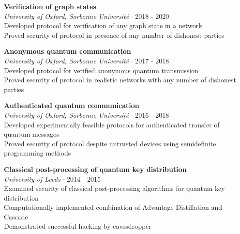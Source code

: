 \documentclass[12pt,a4paper]{article}
\newcommand{\middot}{\boldsymbol{\cdot}}
\begin{document}
\vspace{3mm}

\begin{flushleft}
\textbf{Verification of graph states} \\
\textit{University of Oxford, Sorbonne Universit\'e} $\middot$ 2018 - 2020 \\
Developed protocol for verification of any graph state in a network  \\
Proved security of protocol in presence of any number of dishonest parties 
\end{flushleft}

\vspace{1mm}

\begin{flushleft}
\textbf{Anonymous quantum communication} \\
\textit{University of Oxford, Sorbonne Universit\'e} $\middot$ 2017 - 2018 \\
Developed protocol for verified anonymous quantum transmission \\
Proved security of protocol in realistic networks with any number of dishonest parties 
\end{flushleft}

\vspace{1mm}

\begin{flushleft}
\textbf{Authenticated quantum communication} \\
\textit{University of Oxford, Sorbonne Universit\'e} $\middot$ 2016 - 2018 \\
Developed experimentally feasible protocols for authenticated transfer of quantum messages \\
Proved security of protocol despite untrusted devices using semidefinite programming methods 
\end{flushleft}
\newpage
\begin{flushleft}
\textbf{Classical post-processing of quantum key distribution} \\
\textit{University of Leeds} $\middot$ 2014 - 2015 \\
Examined security of classical post-processing algorithms for quantum key distribution \\ 
Computationally implemented combination of Advantage Distillation and Cascade \\
Demonstrated successful hacking by eavesdropper 
\end{flushleft} 

\vspace{1mm}
\end{document}
